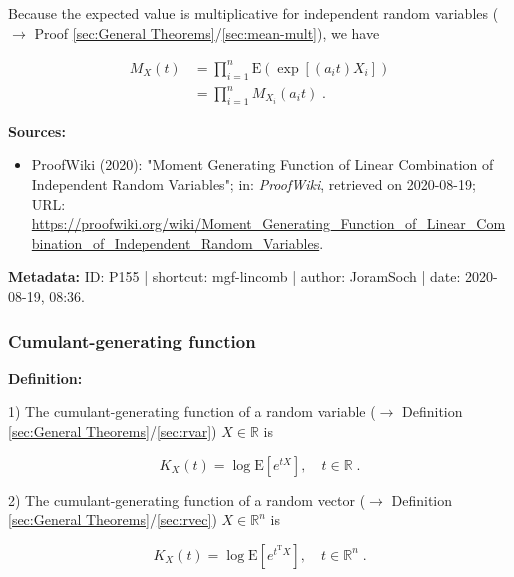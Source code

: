 \documentclass[a4paper,12pt,twoside]{book}
\begin{document}
Because the expected value is multiplicative for independent random variables ($\rightarrow$ Proof \ref{sec:General Theorems}/\ref{sec:mean-mult}), we have

\begin{equation} \label{eq:mgf-lincomb-mgf-lincomb-s2}
\begin{split}
M_X(t) &= \prod_{i=1}^{n} \mathrm{E} \left( \exp \left[ (a_i t) X_i \right] \right) \\
&= \prod_{i=1}^{n} M_{X_i}(a_i t) \; .
\end{split}
\end{equation}


\vspace{1em}
\textbf{Sources:}
\begin{itemize}
\item ProofWiki (2020): "Moment Generating Function of Linear Combination of Independent Random Variables"; in: \textit{ProofWiki}, retrieved on 2020-08-19; URL: \url{https://proofwiki.org/wiki/Moment_Generating_Function_of_Linear_Combination_of_Independent_Random_Variables}.
\end{itemize}


\vspace{1em}
\textbf{Metadata:} ID: P155 | shortcut: mgf-lincomb | author: JoramSoch | date: 2020-08-19, 08:36.
\vspace{1em}



\subsubsection[\textit{Cumulant-generating function}]{Cumulant-generating function} \label{sec:cgf}
\setcounter{equation}{0}

\textbf{Definition:}

1) The cumulant-generating function of a random variable ($\rightarrow$ Definition \ref{sec:General Theorems}/\ref{sec:rvar}) $X \in \mathbb{R}$ is

\begin{equation} \label{eq:cgf-cgf-var}
K_X(t) = \log \mathrm{E} \left[ e^{tX} \right], \quad t \in \mathbb{R} \; .
\end{equation}

2) The cumulant-generating function of a random vector ($\rightarrow$ Definition \ref{sec:General Theorems}/\ref{sec:rvec}) $X \in \mathbb{R}^n$ is

\begin{equation} \label{eq:cgf-cgf-vec}
K_X(t) = \log \mathrm{E} \left[ e^{t^\mathrm{T}X} \right], \quad t \in \mathbb{R}^n \; .
\end{equation}
\end{document}
